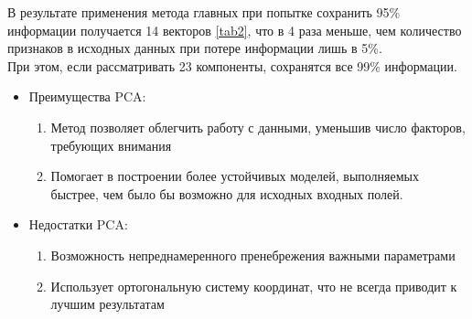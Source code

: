 \documentclass[../body.tex]{subfiles}
\begin{document}
	В результате применения метода главных при попытке сохранить 95\% информации получается 14 векторов \eqref{tab2}, что в 4 раза меньше, чем количество признаков в исходных данных при потере информации лишь в 5\%. \\
	При этом, если рассматривать 23 компоненты, сохранятся все 99\% информации. \\
\begin{itemize}
	\item Преимущества PCA:\\
	\begin{enumerate}
		\item 	Метод позволяет облегчить работу с данными, уменьшив число факторов, требующих внимания
		\item Помогает в построении более устойчивых моделей, выполняемых быстрее, чем было бы возможно для исходных входных полей.
	\end{enumerate}
	\item Недостатки PCA:
	\begin{enumerate}
	\item Возможность непреднамеренного пренебрежения важными параметрами
	\item Использует ортогональную систему координат, что не всегда приводит к лучшим результатам
	\end{enumerate}
\end{itemize}
\end{document}
